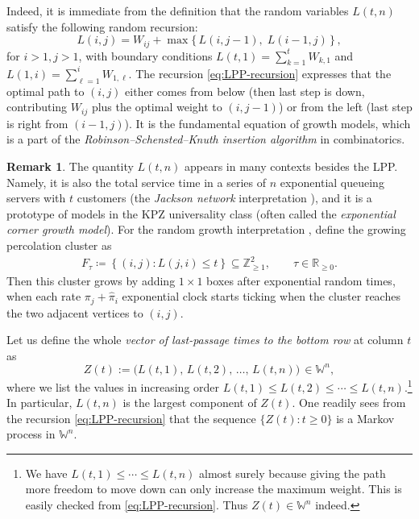 \documentclass[letterpaper,11pt,oneside,reqno]{article}
\numberwithin{equation}{section}
\theoremstyle{definition}
\newtheorem{remark}[proposition]{Remark}
\begin{document}
Indeed, it is immediate from the definition that the random
variables $L(t,n)$ satisfy the following random recursion:
\begin{equation}\label{eq:LPP-recursion}
L(i,j) = W_{ij} + \max\{\, L(i,j-1),\; L(i-1,j)\,\}\,,
\end{equation}
for $i>1, j>1$, with boundary conditions $L(t,1) =
\sum_{k=1}^t W_{k,1}$ and $L(1,i) =
\sum_{\ell=1}^i W_{1,\ell}$.
The recursion \eqref{eq:LPP-recursion} expresses
that the optimal path to $(i,j)$ either comes from below
(then last step is down, contributing $W_{ij}$ plus the
optimal weight to $(i,j-1)$) or from the left (last step is
right from $(i-1,j)$). It is the fundamental equation of
growth models, which is a part of the
\emph{Robinson--Schensted--Knuth insertion algorithm} in
combinatorics.


\begin{remark}
	The quantity $L(t,n)$ appears in many contexts besides the LPP.
	Namely,
it is also the total
service time in a series of $n$ exponential queueing servers
with $t$ customers (the \emph{Jackson network}
interpretation \cite{Baryshnikov_GUE2001}), and it is a
prototype of models in the KPZ universality class (often
called the \emph{exponential corner growth model}).
For the random growth interpretation \cite{johansson2000shape},
define the growing percolation cluster as
\begin{equation*}
\begin{split}
F_\tau\coloneqq
\left\{ (i,j)\colon L(j,i)\le t \right\} \subseteq \mathbb{Z}_{\ge1}^2,
\qquad \tau \in \mathbb{R}_{\ge0}.
\end{split}
\end{equation*}
Then this cluster grows by adding $1\times 1$ boxes
after exponential random times, when
each rate $\pi_j+\hat \pi_i$
exponential clock starts ticking
when the cluster reaches the two adjacent vertices
to $(i,j)$.
\end{remark}

Let us define the whole \emph{vector of last-passage times to the bottom row} at column $t$ as
\[ Z(t) := \big( L(t,1),\, L(t,2),\, \dots,\, L(t,n)\big)\,\in \mathbb{W}^n, \]
where we list the values in increasing order $L(t,1)\le
L(t,2)\le \cdots \le L(t,n)$.\footnote{We have $L(t,1)\le
\cdots\le L(t,n)$ almost surely because giving the path more
freedom to move down can only increase the maximum weight.
This is easily checked from \eqref{eq:LPP-recursion}. Thus
$Z(t)\in \mathbb{W}^n$ indeed.} In particular, $L(t,n)$ is
the largest component of $Z(t)$.
One readily sees from the recursion \eqref{eq:LPP-recursion} that
the sequence
$\{Z(t):t\ge0\}$ is a Markov
process in $\mathbb{W}^n$.
\end{document}

